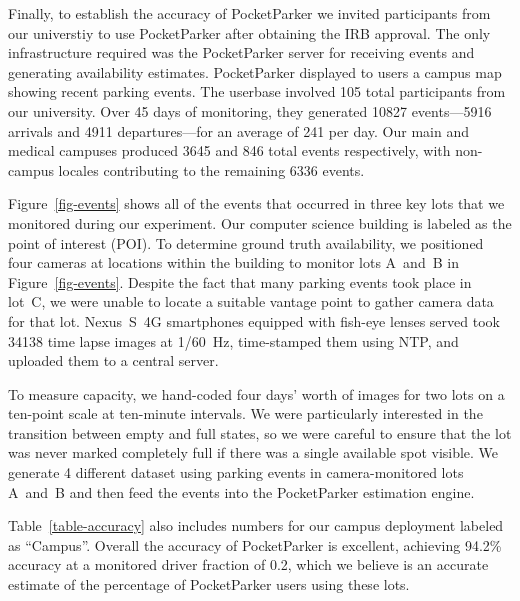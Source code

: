 Finally, to establish the accuracy of PocketParker we invited participants
from our universtiy to use PocketParker after obtaining the IRB approval. The
only infrastructure required was the PocketParker server for receiving events
and generating availability estimates.  PocketParker displayed to users a
campus map showing recent parking events. The userbase involved 105 total
participants from our university.  Over 45 days of monitoring, they generated
\num{10827} events---5916 arrivals and 4911 departures---for an average of
241 per day. Our main and medical campuses produced 3645 and 846 total events
respectively, with non-campus locales contributing to the remaining 6336
events.

Figure~\ref{fig-events} shows all of the events that occurred in three key
lots that we monitored during our experiment. Our computer science building
is labeled as the point of interest (POI). To determine ground truth
availability, we positioned four cameras at locations within the building to
monitor lots A~and~B in Figure~\ref{fig-events}. Despite the fact that many
parking events took place in lot~C, we were unable to locate a suitable
vantage point to gather camera data for that lot. Nexus~S~4G smartphones
equipped with fish-eye lenses served took \num{34138} time lapse images at
1/60~Hz, time-stamped them using NTP, and uploaded them to a central server.

To measure capacity, we hand-coded four days' worth of images for two lots on
a ten-point scale at ten-minute intervals. We were particularly interested
in the transition between empty and full states, so we were careful to ensure
that the lot was never marked completely full if there was a single available
spot visible. We generate 4 different dataset using parking events in 
camera-monitored lots A~and~B and then feed the events into the PocketParker
estimation engine.

Table~\ref{table-accuracy} also includes numbers for our campus deployment
labeled as ``Campus''. Overall the accuracy of PocketParker is excellent,
achieving 94.2\% accuracy at a monitored driver fraction of 0.2, which we
believe is an accurate estimate of the percentage of PocketParker users using
these lots.

